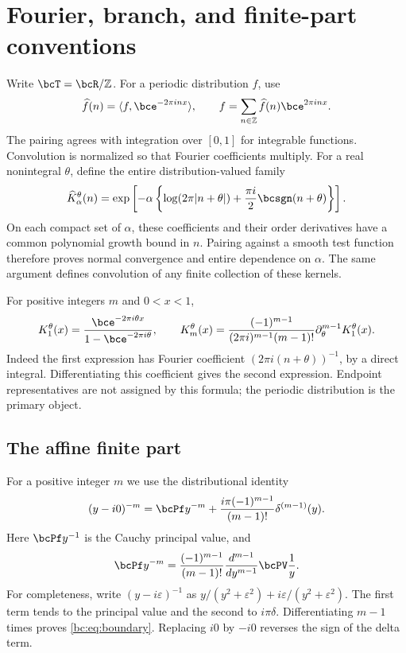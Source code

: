 \section{Fourier, branch, and finite-part conventions}
\label{bc:sec:conventions}

Write $\bcT=\bcR/\mathbb Z$. For a periodic distribution $f$, use
\[
 \widehat f(n)=\langle f,\bce^{-2\pi i n x}\rangle,
 \qquad f=\sum_{n\in\mathbb Z}\widehat f(n)\bce^{2\pi i n x}.
\]
The pairing agrees with integration over $[0,1]$ for integrable functions.
Convolution is normalized so that Fourier coefficients multiply. For a
real nonintegral $\theta$, define the entire distribution-valued family
\begin{equation}\label{bc:eq:kernel}
 \widehat K_\alpha^\theta(n)
  =\exp\left[-\alpha\left\{
       \log(2\pi|n+\theta|)
       +\frac{\pi i}{2}\bcsgn(n+\theta)\right\}\right].
\end{equation}
On each compact set of $\alpha$, these coefficients and their order
derivatives have a common polynomial growth bound in $n$. Pairing against
a smooth test function therefore proves normal convergence and entire
dependence on $\alpha$. The same argument defines convolution of any
finite collection of these kernels.

For positive integers $m$ and $0<x<1$,
\begin{equation}\label{bc:eq:integer-kernel}
 K_1^\theta(x)=\frac{\bce^{-2\pi i\theta x}}{1-\bce^{-2\pi i\theta}},
 \qquad
 K_m^\theta(x)=
 \frac{(-1)^{m-1}}{(2\pi i)^{m-1}(m-1)!}
          \partial_\theta^{m-1}K_1^\theta(x).
\end{equation}
Indeed the first expression has Fourier coefficient
$(2\pi i(n+\theta))^{-1}$, by a direct integral. Differentiating this
coefficient gives the second expression. Endpoint representatives are
not assigned by this formula; the periodic distribution is the primary
object.

\subsection{The affine finite part}

For a positive integer $m$ we use the distributional identity
\begin{equation}\label{bc:eq:boundary}
 (y-i0)^{-m}
 =\bcPf y^{-m}
  +\frac{i\pi(-1)^{m-1}}{(m-1)!}\delta^{(m-1)}(y).
\end{equation}
Here $\bcPf y^{-1}$ is the Cauchy principal value, and
\[
 \bcPf y^{-m}=\frac{(-1)^{m-1}}{(m-1)!}
                     \frac{d^{m-1}}{dy^{m-1}}\bcPV\frac1y.
\]
For completeness, write $(y-i\varepsilon)^{-1}$ as
$y/(y^2+\varepsilon^2)+i\varepsilon/(y^2+\varepsilon^2)$.
The first term tends to the principal value and the second to $i\pi\delta$.
Differentiating $m-1$ times proves \eqref{bc:eq:boundary}. Replacing $i0$
by $-i0$ reverses the sign of the delta term.

